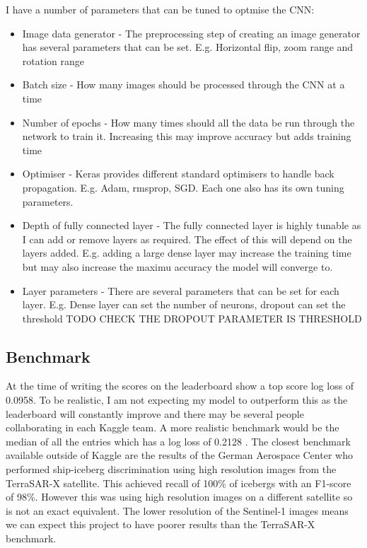 \documentclass{article}
\begin{document}
I have a number of parameters that can be tuned to optmise the CNN:
\begin{itemize}
\item Image data generator - The preprocessing step of creating an image generator has several parameters that can be set. E.g. Horizontal flip, zoom range and rotation range
\item Batch size - How many images should be processed through the CNN at a time
\item Number of epochs - How many times should all the data be run through the network to train it. Increasing this may improve accuracy but adds training time
\item Optimiser - Keras provides different standard optimisers to handle back propagation. E.g. Adam, rmsprop, SGD. Each one also has its own tuning parameters.
\item Depth of fully connected layer - The fully connected layer is highly tunable as I can add or remove layers as required. The effect of this will depend on the layers added. E.g. adding a large dense layer may increase the training time but may also increase the maximu accuracy the model will converge to. 
\item Layer parameters - There are several parameters that can be set for each layer. E.g. Dense layer can set the number of neurons, dropout can set the threshold TODO CHECK THE DROPOUT PARAMETER IS THRESHOLD
\end{itemize}


\subsection{Benchmark}
At the time of writing the scores on the leaderboard show a top score log loss of 0.0958. To be realistic, I am not expecting my model to outperform this as the leaderboard will constantly improve and there may be several people collaborating in each Kaggle team. A more realistic benchmark would be the median of all the entries which has a log loss of 0.2128 \cite{kaggle}.
The closest benchmark available outside of Kaggle are the results of the German Aerospace Center \cite{bentes} who performed ship-iceberg discrimination using high resolution images from the TerraSAR-X satellite. This achieved recall of 100\% of icebergs with an F1-score of 98\%. However this was using high resolution images on a different satellite so is not an exact equivalent. The lower resolution of the Sentinel-1 images means we can expect this project to have poorer results than the TerraSAR-X benchmark. 
\end{document}
